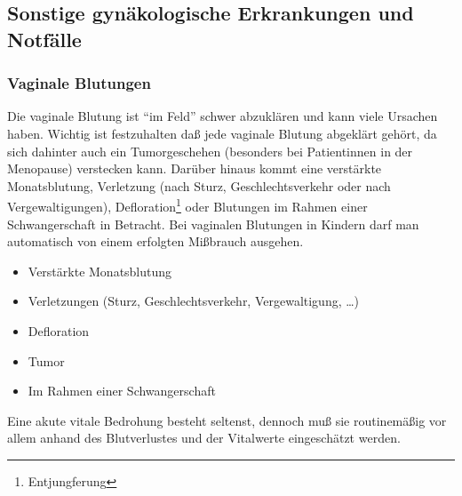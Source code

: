 \subsection{Sonstige gynäkologische Erkrankungen und
Notfälle}

\subsubsection{Vaginale Blutungen}

\gMarried
{Die vaginale Blutung ist "`im Feld"' schwer abzuklären und
kann viele Ursachen haben. Wichtig ist festzuhalten daß
jede vaginale Blutung abgeklärt gehört, da sich dahinter
auch ein Tumorgeschehen (besonders bei Patientinnen in der
Menopause) verstecken kann. Darüber hinaus kommt eine
verstärkte Monatsblutung, Verletzung (nach Sturz, 
Geschlechtsverkehr oder nach Vergewaltigungen),
Defloration\footnote{Entjungferung} oder Blutungen im Rahmen
einer Schwangerschaft in Betracht. Bei vaginalen Blutungen in Kindern darf man 
automatisch von einem erfolgten Mißbrauch ausgehen. }
{\begin{itemize}
    \item Verstärkte Monatsblutung
    \item Verletzungen (Sturz, Geschlechtsverkehr, Vergewaltigung,
\ldots)
\item Defloration
\item Tumor
\item Im Rahmen einer Schwangerschaft
\end{itemize}}

Eine akute vitale Bedrohung besteht seltenst, dennoch muß
sie routinemäßig vor allem anhand des Blutverlustes und der
Vitalwerte eingeschätzt werden. 







\cleardoublepage

